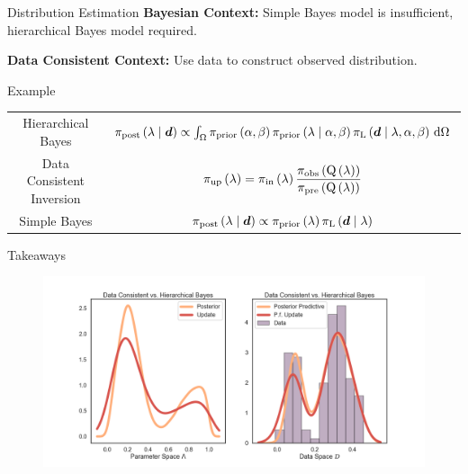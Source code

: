 \begin{block}{Distribution Estimation}
\centering
            {\large \textbf{Bayesian Context:} Simple Bayes model is insufficient, hierarchical Bayes model required.}
           
           {\large \textbf{Data Consistent Context:} Use data to construct observed distribution.}

             
\end{block}


\begin{block}{Example}

\centering
\begin{tabular}{cc}
Hierarchical Bayes & $\Hbayes$\\
Data Consistent Inversion & $\dci$ \\
Simple Bayes & $\bayes$
\end{tabular}

\end{block}





\begin{block}{Takeaways}

\centering
\vspace{1cm}
\begin{figure}
        \includegraphics[width=30cm]{figures/distr_EX_comparison.png}
        \vspace{-0.5cm}
        \caption{ }
    \end{figure}
\end{block}
